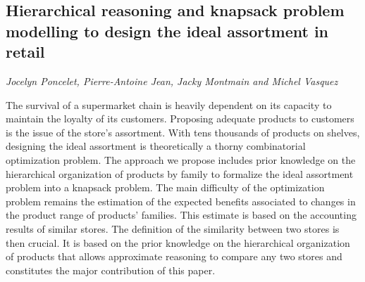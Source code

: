 \documentclass[../booklet.tex]{subfiles}
\begin{document}
\subsection[Hierarchical reasoning and knapsack problem modelling to design the ideal assortment in retail. {\it Jocelyn Poncelet, Pierre-Antoine Jean, Jacky Montmain and Michel Vasquez}]{Hierarchical reasoning and knapsack problem modelling to design the ideal assortment in retail}
   

\begin{center}
  {\it Jocelyn Poncelet, Pierre-Antoine Jean, Jacky Montmain and Michel Vasquez}
\end{center}



The survival of a supermarket chain is heavily dependent on its capacity to maintain the loyalty of its customers. Proposing adequate products to customers is the issue of the store's assortment. With tens thousands of products on shelves, designing the ideal assortment is theoretically a thorny combinatorial optimization problem. The approach we propose includes prior knowledge on the hierarchical organization of products by family to formalize the ideal assortment problem into a knapsack problem. The main difficulty of the optimization problem remains the estimation of the expected benefits associated to changes in the product range of products' families. This estimate is based on the accounting results of similar stores. The definition of the similarity between two stores is then crucial. It is based on the prior knowledge on the hierarchical organization of products that allows approximate reasoning to compare any two stores and constitutes the major contribution of this paper.
\end{document}
